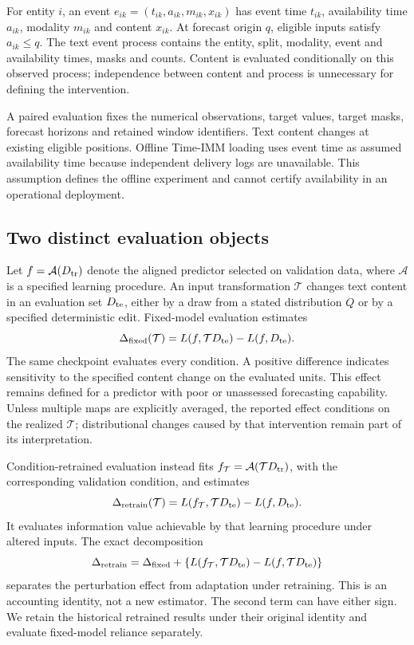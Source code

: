 \documentclass[preprint,11pt]{elsarticle}
\newcommand{\fixed}{\mathrm{fixed}}
\newcommand{\retrain}{\mathrm{retrain}}
\begin{document}
For entity $i$, an event $e_{ik}=(t_{ik},a_{ik},m_{ik},x_{ik})$ has event time $t_{ik}$, availability time $a_{ik}$, modality $m_{ik}$ and content $x_{ik}$. At forecast origin $q$, eligible inputs satisfy $a_{ik}\leq q$. The text event process contains the entity, split, modality, event and availability times, masks and counts. Content is evaluated conditionally on this observed process; independence between content and process is unnecessary for defining the intervention.

A paired evaluation fixes the numerical observations, target values, target masks, forecast horizons and retained window identifiers. Text content changes at existing eligible positions. Offline Time-IMM loading uses event time as assumed availability time because independent delivery logs are unavailable. This assumption defines the offline experiment and cannot certify availability in an operational deployment.

\subsection{Two distinct evaluation objects}

Let $f=\mathcal{A}(D_{\rm tr})$ denote the aligned predictor selected on validation data, where $\mathcal{A}$ is a specified learning procedure. An input transformation $\mathcal{T}$ changes text content in an evaluation set $D_{\rm te}$, either by a draw from a stated distribution $Q$ or by a specified deterministic edit. Fixed-model evaluation estimates
\begin{equation}
\Delta_{\fixed}(\mathcal{T})=
L(f,\mathcal{T}D_{\rm te})-L(f,D_{\rm te}).
\label{eq:fixed}
\end{equation}
The same checkpoint evaluates every condition. A positive difference indicates sensitivity to the specified content change on the evaluated units. This effect remains defined for a predictor with poor or unassessed forecasting capability. Unless multiple maps are explicitly averaged, the reported effect conditions on the realized $\mathcal{T}$; distributional changes caused by that intervention remain part of its interpretation.

Condition-retrained evaluation instead fits $f_{\mathcal{T}}=\mathcal{A}(\mathcal{T}D_{\rm tr})$, with the corresponding validation condition, and estimates
\begin{equation}
\Delta_{\retrain}(\mathcal{T})=
L(f_{\mathcal{T}},\mathcal{T}D_{\rm te})-L(f,D_{\rm te}).
\label{eq:retrain}
\end{equation}
It evaluates information value achievable by that learning procedure under altered inputs. The exact decomposition
\begin{equation}
\Delta_{\retrain}=\Delta_{\fixed}
+\{L(f_{\mathcal{T}},\mathcal{T}D_{\rm te})-L(f,\mathcal{T}D_{\rm te})\}
\end{equation}
separates the perturbation effect from adaptation under retraining. This is an accounting identity, not a new estimator. The second term can have either sign. We retain the historical retrained results under their original identity and evaluate fixed-model reliance separately.
\end{document}
